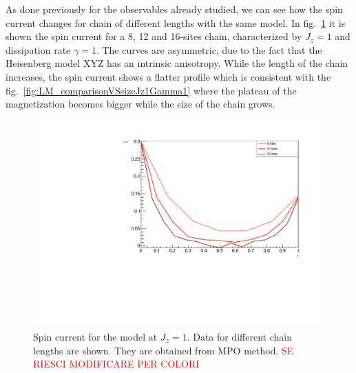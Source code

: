 %
%
%

As done previously for the observables already studied, we can see how the spin current changes for chain of different lengths with the same model. In fig.~\ref{fig:NORM_SpinCurr_comparisonVSsize} it is shown the spin current for a 8, 12 and 16-sites chain, characterized by $J_z = 1$ and dissipation rate $\gamma = 1$. The curves are asymmetric, due to the fact that the Heisenberg model XYZ has an intrinsic anisotropy. While the length of the chain increases, the spin current shows a flatter profile which is consistent with the fig.~\ref{fig:LM_comparisonVSsizeJz1Gamma1} where the plateau of the magnetization becomes bigger while the size of the chain grows.

\begin{figure}[H]
    \centering
    \includegraphics[scale=0.7]{Figures/NORM_SpinCurr_comparisonVSsize.pdf}
    \caption{Spin current for the model at $J_z = 1$. Data for different chain lengths are shown. They are obtained from MPO method. \textcolor{red}{SE RIESCI MODIFICARE PER COLORI}}
    \label{fig:NORM_SpinCurr_comparisonVSsize}
\end{figure}

